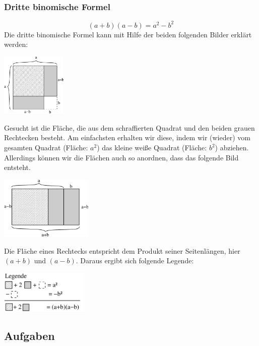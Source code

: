 \subsubsection{Dritte binomische Formel}
	\[(a + b)(a - b) = a^2 - b^2\]
Die dritte binomische Formel kann mit Hilfe der beiden folgenden Bilder erklärt werden:
\begin{center}
\includegraphics[height=3cm]{img/binF3a.pdf}
\end{center}
Gesucht ist die Fläche, die aus dem schraffierten Quadrat und den beiden grauen Rechtecken besteht. Am einfachsten erhalten wir diese, indem wir (wieder) vom gesamten Quadrat (Fläche: $a^2$) das kleine wei\ss e Quadrat (Fläche: $b^2$) abziehen. Allerdings können wir die Flächen auch so anordnen, dass das folgende Bild entsteht.
\begin{center}
\includegraphics[height=3cm]{img/binF3b.pdf}
\end{center}
Die Fläche eines Rechtecks entspricht dem Produkt seiner Seitenlängen, hier $(a+b)$ und $(a-b)$. Daraus ergibt sich folgende Legende:
\begin{center}
\includegraphics[height=2cm]{img/binF3legende.pdf}
\end{center}

\subsection{Aufgaben}

